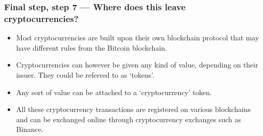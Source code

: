 \begin{frame}[fragile]\frametitle{Final step, step 7 — Where does this leave cryptocurrencies?}
\begin{itemize}
\item Most cryptocurrencies are built upon their own blockchain protocol that may have different rules from the Bitcoin blockchain. 
\item Cryptocurrencies can however be given any kind of value, depending on their issuer. They could be referred to as ‘tokens’. 
\item Any sort of value can be attached to a ‘cryptocurrency’ token. 
\item All these cryptocurrency transactions are registered on various blockchains and can be exchanged online through cryptocurrency exchanges such as Binance. 
\end{itemize}


\end{frame}

